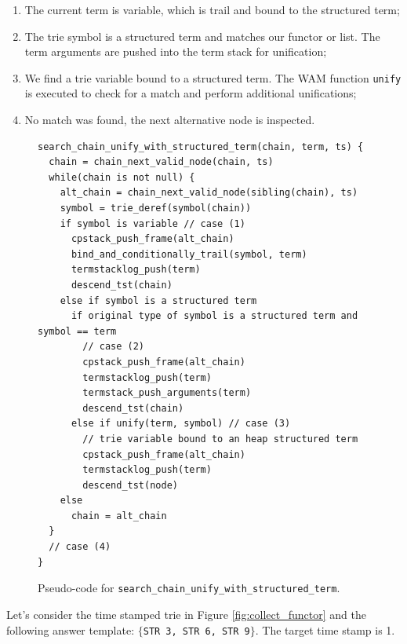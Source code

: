 \begin{enumerate}
  \item The current term is variable, which is trail and bound to the structured term;
  \item The trie symbol is a structured term and matches our functor or list.
  The term arguments are pushed into the term stack for unification;
  \item We find a trie variable bound to a structured term. The WAM function \texttt{unify} is executed to check for a match and perform additional unifications;
  \item No match was found, the next alternative node is inspected.
\end{enumerate}

\begin{figure}[H]
\begin{Verbatim}[fontsize=\small]
search_chain_unify_with_structured_term(chain, term, ts) {
  chain = chain_next_valid_node(chain, ts)
  while(chain is not null) {
    alt_chain = chain_next_valid_node(sibling(chain), ts)
    symbol = trie_deref(symbol(chain))
    if symbol is variable // case (1)
      cpstack_push_frame(alt_chain)
      bind_and_conditionally_trail(symbol, term)
      termstacklog_push(term)
      descend_tst(chain)
    else if symbol is a structured term
      if original type of symbol is a structured term and symbol == term
        // case (2)
        cpstack_push_frame(alt_chain)
        termstacklog_push(term)
        termstack_push_arguments(term)
        descend_tst(chain)
      else if unify(term, symbol) // case (3)
        // trie variable bound to an heap structured term
        cpstack_push_frame(alt_chain)
        termstacklog_push(term)
        descend_tst(node)
    else
      chain = alt_chain
  }
  // case (4)
}
\end{Verbatim}
\caption{Pseudo-code for \texttt{search\_chain\_unify\_with\_structured\_term}.}
\label{fig:search_chain_unify_with_structured_term}
\end{figure}

Let's consider the time stamped trie in Figure \ref{fig:collect_functor}
and the following answer template: $\{$\texttt{STR 3, STR 6, STR 9}$\}$.
The target time stamp is 1.

